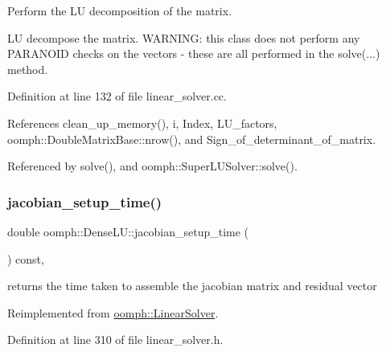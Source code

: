 Perform the LU decomposition of the matrix. 

LU decompose the matrix. W\+A\+R\+N\+I\+NG\+: this class does not perform any P\+A\+R\+A\+N\+O\+ID checks on the vectors -\/ these are all performed in the solve(...) method. 

Definition at line 132 of file linear\+\_\+solver.\+cc.



References clean\+\_\+up\+\_\+memory(), i, Index, L\+U\+\_\+factors, oomph\+::\+Double\+Matrix\+Base\+::nrow(), and Sign\+\_\+of\+\_\+determinant\+\_\+of\+\_\+matrix.



Referenced by solve(), and oomph\+::\+Super\+L\+U\+Solver\+::solve().

\mbox{\label{classoomph_1_1DenseLU_a4605ec2ca02ff0b30f4cefc2458dfb66}} 
\subsubsection{\texorpdfstring{jacobian\+\_\+setup\+\_\+time()}{jacobian\_setup\_time()}}
{\footnotesize\ttfamily double oomph\+::\+Dense\+L\+U\+::jacobian\+\_\+setup\+\_\+time (\begin{DoxyParamCaption}{ }\end{DoxyParamCaption}) const\hspace{0.3cm}{\ttfamily [inline]}, {\ttfamily [virtual]}}



returns the time taken to assemble the jacobian matrix and residual vector 



Reimplemented from \hyperlink{classoomph_1_1LinearSolver_a0fedfb9d9855d0e998c0e32140bc56d4}{oomph\+::\+Linear\+Solver}.



Definition at line 310 of file linear\+\_\+solver.\+h.

\mbox{\label{classoomph_1_1DenseLU_aabe93cf400bb488f0bc08755ee0dfde4}} 
